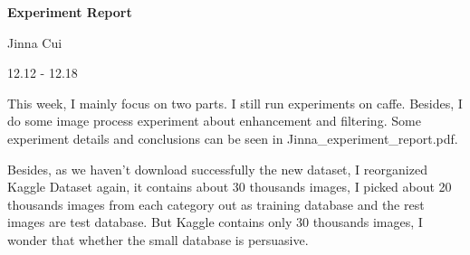 \documentclass{article}
\begin{document}


\pagestyle{fancy}
\begin{center}
\textbf{\LARGE{Experiment Report}} %
\end{center}

\begin{center}
Jinna Cui
\end{center}

\begin{center}
12.12 - 12.18
\end{center}

This week, I mainly focus on two parts. I still run experiments on caffe. Besides, I do some image process experiment about enhancement and filtering. Some experiment details and conclusions can be seen in Jinna\_experiment\_report.pdf.

Besides, as we haven't download successfully the new dataset,  I reorganized Kaggle Dataset again, it contains about 30 thousands images, I picked about 20 thousands images from each category out as training database and the rest images are test database. But Kaggle contains only 30 thousands images,  I wonder that whether the small database is persuasive. 
\end{document}
